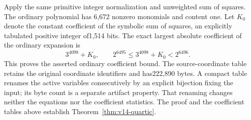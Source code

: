 Apply the same primitive integer normalization and
unweighted sum of squares. The ordinary polynomial has
6,672 nonzero monomials and content one.
Let $K_0$ denote the constant coefficient of the symbolic
sum of squares, an explicitly tabulated positive integer
of1,514 bits. The exact largest absolute coefficient of
the ordinary expansion is
\[
 3^{4098}+K_0,\qquad
 2^{6495}\leq3^{4098}+K_0<2^{6496}.
\]
This proves the asserted ordinary coefficient bound.
The source-coordinate table retains the original coordinate
identifiers and has222,890 bytes. A compact table renames
the active variables consecutively by an explicit bijection
fixing the input; its byte count is a separate artifact
property. That renaming changes neither the equations nor
the coefficient statistics. The proof and the coefficient
tables above establish Theorem~\ref{thm:v14-quartic}.
